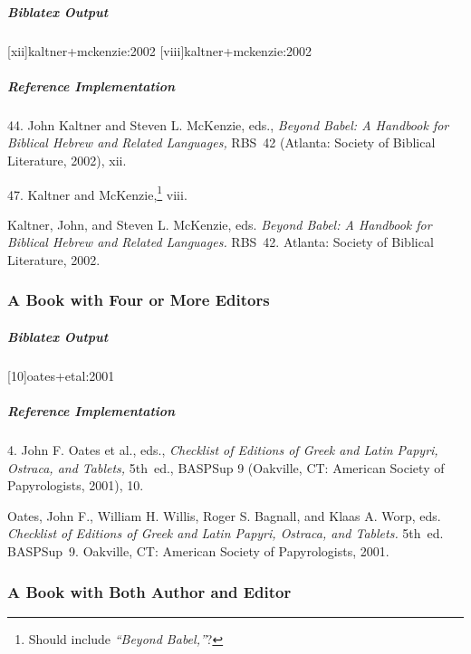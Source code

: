 \documentclass[a4paper]{article}
\newenvironment{biboutput}{%
  \subparagraph{Biblatex Output}
}{\color{black}}
\newenvironment{refimp}{%
  \subparagraph{Reference Implementation}
  \color{reference-colour}
  \rm
}{\par\color{black}}
\begin{document}
\begin{biboutput}
  [xii]{kaltner+mckenzie:2002}
  [viii]{kaltner+mckenzie:2002}
\end{biboutput}

\begin{refimp}
  \hspace*{\bibindent}44. John Kaltner and Steven L. McKenzie, eds.,
  \emph{Beyond Babel: A Handbook for Biblical Hebrew and Related Languages,}
  RBS~42 (Atlanta: Society of Biblical Literature, 2002), xii.

  \hspace*{\bibindent}47. Kaltner and McKenzie,\footnote{Should include
  \emph{“Beyond Babel,”}?} viii.

  \hangindent\bibindent Kaltner, John, and Steven L. McKenzie, eds.
  \emph{Beyond Babel: A Handbook for Biblical Hebrew and Related Languages.}
  RBS~42. Atlanta: Society of Biblical Literature, 2002.

\end{refimp}

\subsubsection{A Book with Four or More Editors}

\begin{biboutput}
  [10]{oates+etal:2001}
\end{biboutput}

\begin{refimp}
  \hspace*{\bibindent}4. John F. Oates et al., eds., \emph{Checklist of
  Editions of Greek and Latin Papyri, Ostraca, and Tablets,} 5th~ed., BASPSup
  9 (Oakville, CT: American Society of Papyrologists, 2001), 10.

  \hangindent\bibindent Oates, John F., William H. Willis, Roger S. Bagnall,
  and Klaas A. Worp, eds. \emph{Checklist of Editions of Greek and Latin
  Papyri, Ostraca, and Tablets.} 5th~ed. BASPSup~9. Oakville, CT: American
  Society of Papyrologists, 2001.

\end{refimp}

\subsubsection{A Book with Both Author and Editor}
\end{document}

